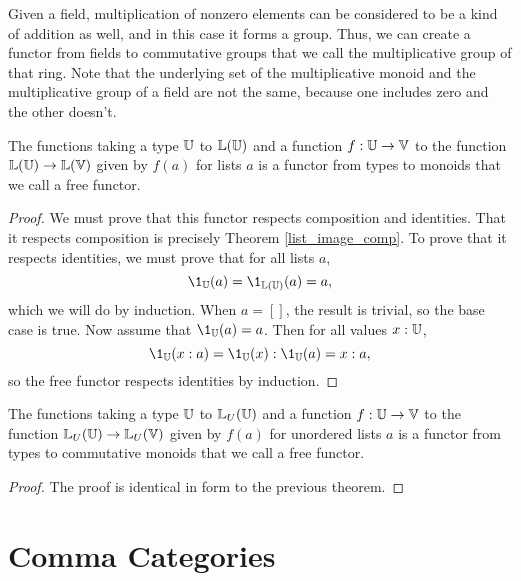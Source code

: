 \documentclass[../../math.tex]{subfiles}
\begin{document}
\begin{definition}
    Given a field, multiplication of nonzero elements can be considered to be a
    kind of addition as well, and in this case it forms a group.  Thus, we can
    create a functor from fields to commutative groups that we call the
    multiplicative group of that ring.  Note that the underlying set of the
    multiplicative monoid and the multiplicative group of a field are not the
    same, because one includes zero and the other doesn't.
\end{definition}

\begin{theorem}
    The functions taking a type $\mathbb{U}$ to $\mathbb{L}(\mathbb{U})$ and a function $f : \mathbb{U} \to \mathbb{V}$
    to the function $\mathbb{L}(\mathbb{U}) \to \mathbb{L}(\mathbb{V})$ given by $f(a)$ for lists $a$ is a
    functor from types to monoids that we call a free functor.
\end{theorem}
\begin{proof}
    We must prove that this functor respects composition and identities.  That
    it respects composition is precisely Theorem \ref{list_image_comp}.  To
    prove that it respects identities, we must prove that for all lists $a$,
    \[
        \1_{\U}(a) = \1_{\L(\U)}(a) = a,
    \]
    which we will do by induction.  When $a = []$, the result is trivial, so the
    base case is true.  Now assume that $\1_{\U}(a) = a$.  Then for all values
    $x : \mathbb{U}$,
    \[
        \1_{\U}(x : a) = \1_{\U}(x) : \1_{\U}(a) = x : a,
    \]
    so the free functor respects identities by induction.
\end{proof}

\begin{theorem}
    The functions taking a type $\mathbb{U}$ to $\mathbb{L}_U(\mathbb{U})$ and a function $f : \mathbb{U} \to
    \mathbb{V}$ to the function $\mathbb{L}_U(\mathbb{U}) \to \mathbb{L}_U(\mathbb{V})$ given by $f(a)$ for unordered
    lists $a$ is a functor from types to commutative monoids that we call a free
    functor.
\end{theorem}
\begin{proof}
    The proof is identical in form to the previous theorem.
\end{proof}

\section{Comma Categories}
\end{document}
